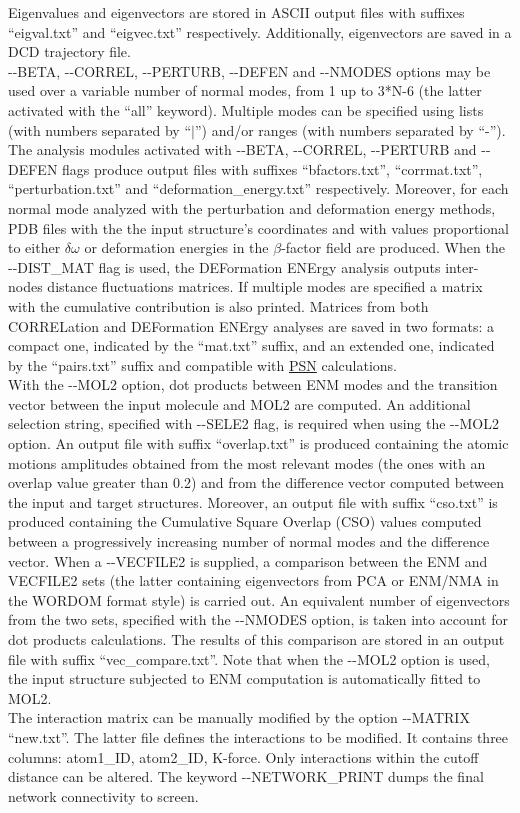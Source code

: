 \documentclass[11pt,twoside,onecolumn,a4paper,openright,notitlepage]{book}[2001/04/21]
\begin{document}
Eigenvalues and eigenvectors are stored in ASCII output files with suffixes ``eigval.txt'' and ``eigvec.txt'' respectively. Additionally, eigenvectors are saved in a DCD trajectory file.\\
-{}-BETA, -{}-CORREL, -{}-PERTURB, -{}-DEFEN and -{}-NMODES options may be used over a variable number of normal modes, from 1 up to 3*N-6 (the latter activated with the ``all'' keyword). Multiple modes can be specified using lists (with numbers separated by ``$\vert$'') and/or ranges (with numbers separated by ``-'').\\
The analysis modules activated with -{}-BETA, -{}-CORREL, -{}-PERTURB and -{}-DEFEN flags produce output files with suffixes ``bfactors.txt'', ``corrmat.txt'', ``perturbation.txt'' and ``deformation\_energy.txt'' respectively. Moreover, for each normal mode analyzed with the perturbation and deformation energy methods, PDB files with the the input structure's coordinates and with values proportional to either $\delta{}\omega{}$ or deformation energies in the $\beta{}$-factor field are produced. When the -{}-DIST\_MAT flag is used, the DEFormation ENErgy analysis outputs inter-nodes distance fluctuations matrices. If multiple modes are specified a matrix with the cumulative contribution is also printed. Matrices from both CORRELation and DEFormation ENErgy analyses are saved in two formats: a compact one, indicated by the ``mat.txt'' suffix, and an extended one, indicated by the ``pairs.txt'' suffix and compatible with \hyperref[psn]{PSN} calculations.\\
With the -{}-MOL2 option, dot products between ENM modes and the transition vector between the input molecule and MOL2 are computed.
An additional selection string, specified with -{}-SELE2 flag, is required when using the -{}-MOL2 option. An output file with suffix ``overlap.txt'' is produced containing the atomic motions amplitudes obtained from the most relevant modes (the ones with an overlap value greater than 0.2) and from the difference vector computed between the input and target structures. Moreover, an output file with suffix ``cso.txt'' is produced containing the Cumulative Square Overlap (CSO) values computed between a progressively increasing number of normal modes and the difference vector.
When a -{}-VECFILE2 is supplied, a comparison between the ENM and VECFILE2 sets (the latter containing eigenvectors from PCA or ENM/NMA in the WORDOM format style) is carried out. An equivalent number of eigenvectors from the two sets, specified with the -{}-NMODES option, is taken into account for dot products calculations. The results of this comparison are stored in an output file with suffix ``vec\_compare.txt''. Note that when the -{}-MOL2 option is used, the input structure subjected to ENM computation is automatically fitted to MOL2.\\
The interaction matrix can be manually modified by the option -{}-MATRIX ``new.txt''. The latter file defines the interactions to be modified. It contains three columns: atom1\_ID, atom2\_ID, K-force. Only interactions within the cutoff distance can be altered. The keyword -{}-NETWORK\_PRINT dumps the final network connectivity to screen. \\
\end{document}
